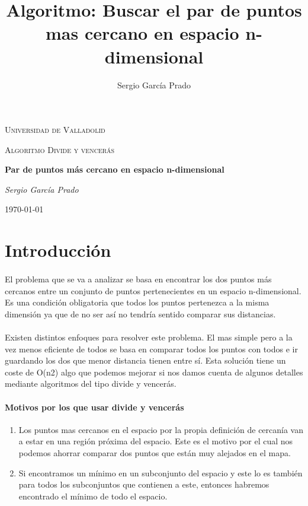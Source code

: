 \documentclass{article}
\title{Algoritmo: Buscar el par de puntos mas cercano en espacio n-dimensional}
\author{Sergio García Prado}
\begin{document}
\begin{titlepage}
	\centering
	{\scshape\LARGE Universidad de Valladolid \par}
	\vspace{1cm}
	{\scshape\Large Algoritmo Divide y vencerás\par}
	\vspace{1.5cm}
	{\huge\bfseries Par de puntos más cercano en espacio n-dimensional\par}
	\vspace{2cm}
	{\Large\itshape Sergio García Prado\par}


	{\large \today\par}
\end{titlepage}

\section{Introducción}

	\paragraph{}
	El problema que se va a analizar se basa en encontrar los dos puntos más cercanos entre un conjunto de puntos pertenecientes en un espacio n-dimensional. Es una condición obligatoria que todos los puntos pertenezca a la misma dimensión ya que de no ser así no tendría sentido comparar sus distancias.
	
	\paragraph{}
	Existen distintos enfoques para resolver este problema. El mas simple pero a la vez menos eficiente de todos se basa en comparar todos los puntos con todos e ir guardando los dos que menor distancia tienen entre sí. Esta solución tiene un coste de O(n2) algo que podemos mejorar si nos damos cuenta de algunos detalles mediante algoritmos del tipo divide y vencerás.

	\paragraph{Motivos por los que usar divide y vencerás}

		\begin{enumerate}
	
			\item
			Los puntos mas cercanos en el espacio por la propia definición de cercanía van a estar en una región próxima del espacio. Este es el motivo por el cual nos podemos ahorrar comparar dos puntos que están muy alejados en el mapa.
			\item
			Si encontramos un mínimo en un subconjunto del espacio y este lo es también para todos los subconjuntos que contienen a este, entonces habremos encontrado el mínimo de todo el espacio.
		
		\end{enumerate}
	
\end{document}
